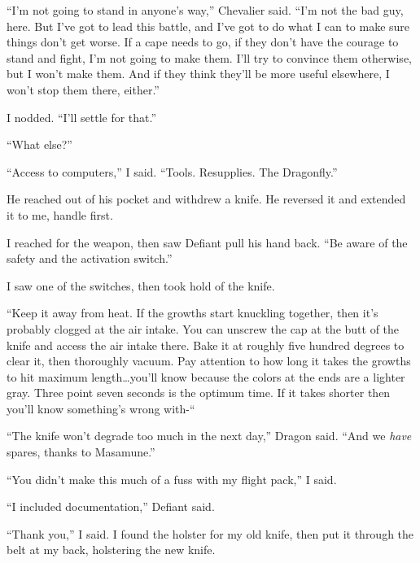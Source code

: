 ``I'm not going to stand in anyone's way,'' Chevalier said.  ``I'm not the bad guy, here.  But I've got to lead this battle, and I've got to do what I can to make sure things don't get worse.  If a cape needs to go, if they don't have the courage to stand and fight, I'm not going to make them.  I'll try to convince them otherwise, but I won't make them.  And if they think they'll be more useful elsewhere, I won't stop them there, either.''



I nodded.  ``I'll settle for that.''



``What else?''



``Access to computers,'' I said.  ``Tools.  Resupplies.  The Dragonfly.''



He reached out of his pocket and withdrew a knife.  He reversed it and extended it to me, handle first.



I reached for the weapon, then saw Defiant pull his hand back.  ``Be aware of the safety and the activation switch.''



I saw one of the switches, then took hold of the knife.



``Keep it away from heat.  If the growths start knuckling together, then it's probably clogged at the air intake.  You can unscrew the cap at the butt of the knife and access the air intake there.  Bake it at roughly five hundred degrees to clear it, then thoroughly vacuum.  Pay attention to how long it takes the growths to hit maximum length\ldots you'll know because the colors at the ends are a lighter gray.  Three point seven seconds is the optimum time.  If it takes shorter then you'll know something's wrong with-``



``The knife won't degrade too much in the next day,'' Dragon said.  ``And we \emph{have} spares, thanks to Masamune.''



``You didn't make this much of a fuss with my flight pack,'' I said.



``I included documentation,'' Defiant said.



``Thank you,'' I said.  I found the holster for my old knife, then put it through the belt at my back, holstering the new knife.



